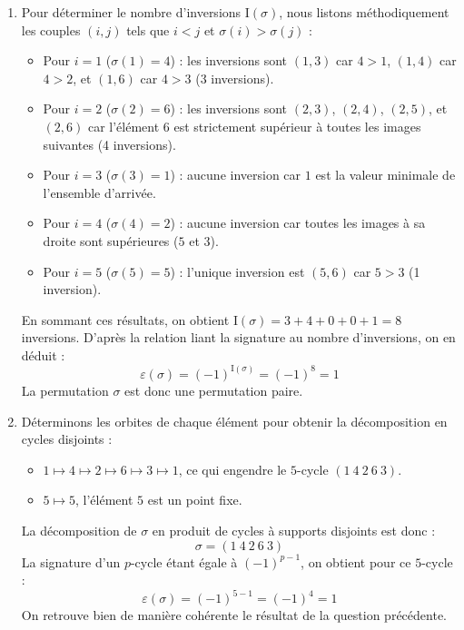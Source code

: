 \documentclass[12pt, a4paper]{report}
\begin{document}
\begin{enumerate}
    \item Pour déterminer le nombre d'inversions $\mathrm{I}(\sigma)$, nous listons méthodiquement les couples $(i,j)$ tels que $i < j$ et $\sigma(i) > \sigma(j)$ :
    \begin{itemize}
        \item Pour $i=1$ ($\sigma(1)=4$) : les inversions sont $(1,3)$ car $4 > 1$, $(1,4)$ car $4 > 2$, et $(1,6)$ car $4 > 3$ (3 inversions).
        \item Pour $i=2$ ($\sigma(2)=6$) : les inversions sont $(2,3)$, $(2,4)$, $(2,5)$, et $(2,6)$ car l'élément $6$ est strictement supérieur à toutes les images suivantes (4 inversions).
        \item Pour $i=3$ ($\sigma(3)=1$) : aucune inversion car $1$ est la valeur minimale de l'ensemble d'arrivée.
        \item Pour $i=4$ ($\sigma(4)=2$) : aucune inversion car toutes les images à sa droite sont supérieures ($5$ et $3$).
        \item Pour $i=5$ ($\sigma(5)=5$) : l'unique inversion est $(5,6)$ car $5 > 3$ (1 inversion).
    \end{itemize}
    En sommant ces résultats, on obtient $\mathrm{I}(\sigma) = 3 + 4 + 0 + 0 + 1 = 8$ inversions. 
    D'après la relation liant la signature au nombre d'inversions, on en déduit :
    $$\varepsilon(\sigma) = (-1)^{\mathrm{I}(\sigma)} = (-1)^8 = 1$$
    La permutation $\sigma$ est donc une permutation paire.

    \item Déterminons les orbites de chaque élément pour obtenir la décomposition en cycles disjoints :
    \begin{itemize}
        \item $1 \mapsto 4 \mapsto 2 \mapsto 6 \mapsto 3 \mapsto 1$, ce qui engendre le $5$-cycle $(1 \ 4 \ 2 \ 6 \ 3)$.
        \item $5 \mapsto 5$, l'élément $5$ est un point fixe.
    \end{itemize}
    La décomposition de $\sigma$ en produit de cycles à supports disjoints est donc :
    $$\sigma = (1 \ 4 \ 2 \ 6 \ 3)$$
    La signature d'un $p$-cycle étant égale à $(-1)^{p-1}$, on obtient pour ce $5$-cycle :
    $$\varepsilon(\sigma) = (-1)^{5-1} = (-1)^4 = 1$$
    On retrouve bien de manière cohérente le résultat de la question précédente.


\end{enumerate}
\end{document}
